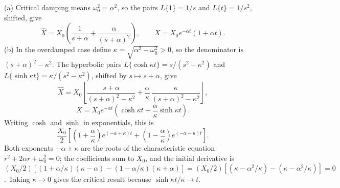 (a) Critical damping means $\omega_0^2=\alpha^2$, so
the pairs $L\{1\}=1/s$ and $L\{t\}=1/s^2$, shifted, give
\[
\widehat X=X_0\left(\frac1{s+\alpha}
+\frac{\alpha}{(s+\alpha)^2}\right),\qquad
\boxed{X=X_0e^{-\alpha t}(1+\alpha t)}.
\]
(b) In the overdamped case define
$\kappa=\sqrt{\alpha^2-\omega_0^2}>0$, so the denominator is
$(s+\alpha)^2-\kappa^2$. The hyperbolic pairs
$L\{\cosh\kappa t\}=s/(s^2-\kappa^2)$ and
$L\{\sinh\kappa t\}=\kappa/(s^2-\kappa^2)$, shifted by
$s\mapsto s+\alpha$, give
\[
\widehat X=X_0\left[\frac{s+\alpha}{(s+\alpha)^2-\kappa^2}
+\frac\alpha\kappa\,\frac{\kappa}{(s+\alpha)^2-\kappa^2}\right],
\]
\[
\boxed{X=X_0e^{-\alpha t}
\left(\cosh\kappa t+\frac\alpha\kappa\sinh\kappa t\right)}.
\]
Writing $\cosh$ and $\sinh$ in exponentials, this is
\[
\frac{X_0}{2}\left[
\left(1+\frac\alpha\kappa\right)e^{(-\alpha+\kappa)t}
+\left(1-\frac\alpha\kappa\right)e^{(-\alpha-\kappa)t}\right].
\]
Both exponents $-\alpha\pm\kappa$ are the roots of the
characteristic equation $r^2+2\alpha r+\omega_0^2=0$; the
coefficients sum to $X_0$, and the initial derivative is
$(X_0/2)[(1+\alpha/\kappa)(\kappa-\alpha)
-(1-\alpha/\kappa)(\kappa+\alpha)]
=(X_0/2)[(\kappa-\alpha^2/\kappa)-(\kappa-\alpha^2/\kappa)]=0$.
Taking $\kappa\to0$ gives the critical result because
$\sinh\kappa t/\kappa\to t$.

